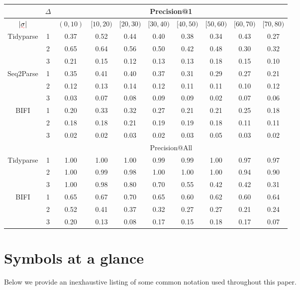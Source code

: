 \documentclass[sigplan,review,acmsmall,nonacm,screen,anonymous]{acmart}\settopmatter{printfolios=false,printccs=false,printacmref=false}
\begin{document}
\begin{table}[!h]
\centering
\begin{tabular}{c|c|cccccccc}
\hline\hline
& $\Delta$ & \multicolumn{8}{c}{Precision@1} \\ \hline
$|\err\sigma|$ &  & $(0,10)$ & $[10,20)$ & $[20,30)$ & $[30, 40)$ & $[40,50)$ & $[50, 60)$ & $[60,70)$ & $[70, 80)$ \\ \hline
Tidyparse
& 1 & 0.37 & 0.52 & 0.44 & 0.40 & 0.38 & 0.34 & 0.43 & 0.27 \\
& 2 & 0.65 & 0.64 & 0.56 & 0.50 & 0.42 & 0.48 & 0.30 & 0.32 \\
& 3 & 0.21 & 0.15 & 0.12 & 0.13 & 0.13 & 0.18 & 0.15 & 0.10 \\ \hline
Seq2Parse
& 1 & 0.35 & 0.41 & 0.40 & 0.37 & 0.31 & 0.29 & 0.27 & 0.21 \\
& 2 & 0.12 & 0.13 & 0.14 & 0.12 & 0.11 & 0.11 & 0.10 & 0.12 \\
& 3 & 0.03 & 0.07 & 0.08 & 0.09 & 0.09 & 0.02 & 0.07 & 0.06 \\ \hline
BIFI
& 1 & 0.20 & 0.33 & 0.32 & 0.27 & 0.21 & 0.21 & 0.25 & 0.18 \\
& 2 & 0.18 & 0.18 & 0.21 & 0.19 & 0.19 & 0.18 & 0.11 & 0.11 \\
& 3 & 0.02 & 0.02 & 0.03 & 0.02 & 0.03 & 0.05 & 0.03 & 0.02 \\ \hline
& & \multicolumn{8}{c}{Precision@All} \\ \hline
Tidyparse
& 1 & 1.00 & 1.00 & 1.00 & 0.99 & 0.99 & 1.00 & 0.97 & 0.97 \\
& 2 & 1.00 & 0.99 & 0.98 & 1.00 & 1.00 & 1.00 & 0.94 & 0.90 \\
& 3 & 1.00 & 0.98 & 0.80 & 0.70 & 0.55 & 0.42 & 0.42 & 0.31 \\ \hline
BIFI
& 1 & 0.65 & 0.67 & 0.70 & 0.65 & 0.60 & 0.62 & 0.60 & 0.64 \\
& 2 & 0.52 & 0.41 & 0.37 & 0.32 & 0.27 & 0.27 & 0.21 & 0.24 \\
& 3 & 0.20 & 0.13 & 0.08 & 0.17 & 0.15 & 0.18 & 0.17 & 0.07 \\ \hline\hline
\end{tabular}
\end{table}

\section{Symbols at a glance}

Below we provide an inexhaustive listing of some common notation used throughout this paper.
\end{document}
